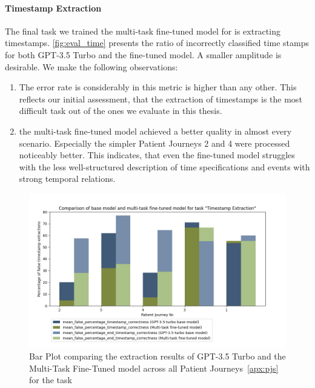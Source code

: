 \paragraph{Timestamp Extraction}
The final task we trained the multi-task fine-tuned model for is extracting timestamps. \autoref{fig:eval_time} presents the ratio of incorrectly classified time stamps for both GPT-3.5 Turbo and the fine-tuned model. A smaller amplitude is desirable. We make the following observations:
\begin{enumerate}
    \item The error rate is considerably in this metric is higher than any other. This reflects our initial assessment, that the extraction of timestamps is the most difficult task out of the ones we evaluate in this thesis.
    \item the multi-task fine-tuned model achieved a better quality in almost every scenario. Especially the simpler Patient Journeys 2 and 4 were processed noticeably better. This indicates, that even the fine-tuned model struggles with the less well-structured description of time specifications and events with strong temporal relations.
\end{enumerate}
\begin{figure}
    \centering
    \includegraphics[width=\textwidth]{bachelor_thesis/images/timestamp_all.png}
    \caption{Bar Plot comparing the extraction results of GPT-3.5 Turbo and the Multi-Task Fine-Tuned model across all Patient Journeys~\ref{apx:pjs} for the task }
    \label{fig:eval_time}
\end{figure}